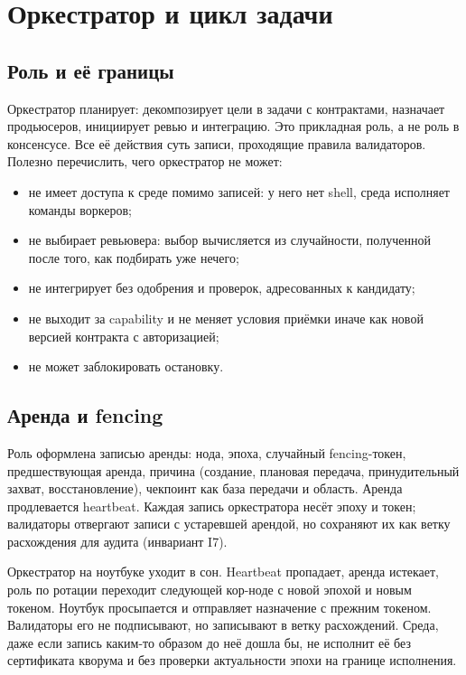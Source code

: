 \chapter{Оркестратор и цикл задачи}

\section{Роль и её границы}

Оркестратор планирует: декомпозирует цели в задачи с контрактами, назначает продьюсеров, инициирует ревью и интеграцию. Это прикладная роль, а не роль в консенсусе. Все её действия суть записи, проходящие правила валидаторов. Полезно перечислить, чего оркестратор не может:

\begin{itemize}
\item не имеет доступа к среде помимо записей: у него нет shell, среда исполняет команды воркеров;
\item не выбирает ревьювера: выбор вычисляется из случайности, полученной после того, как подбирать уже нечего;
\item не интегрирует без одобрения и проверок, адресованных к кандидату;
\item не выходит за capability и не меняет условия приёмки иначе как новой версией контракта с авторизацией;
\item не может заблокировать остановку.
\end{itemize}

\section{Аренда и fencing}

Роль оформлена записью аренды: нода, эпоха, случайный fencing-токен, предшествующая аренда, причина (создание, плановая передача, принудительный захват, восстановление), чекпоинт как база передачи и область. Аренда продлевается heartbeat. Каждая запись оркестратора несёт эпоху и токен; валидаторы отвергают записи с устаревшей арендой, но сохраняют их как ветку расхождения для аудита (инвариант I7).

\begin{exbox}
Оркестратор на ноутбуке уходит в сон. Heartbeat пропадает, аренда истекает, роль по ротации переходит следующей кор-ноде с новой эпохой и новым токеном. Ноутбук просыпается и отправляет назначение с прежним токеном. Валидаторы его не подписывают, но записывают в ветку расхождений. Среда, даже если запись каким-то образом до неё дошла бы, не исполнит её без сертификата кворума и без проверки актуальности эпохи на границе исполнения.
\end{exbox}

